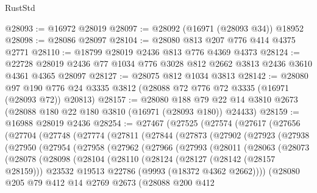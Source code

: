 \begin{lexlean}{RustStd}
\begin{coremodule}
@28093 := @16972 @28019
@28097 := @28092 (@16971 (@28093 @34)) @18952
@28098 := @28086 @28097
@28104 := @28080 @813 @207 @776 @414 @4375 @2771
@28110 := @18799 @28019 @2436 @813 @776 @4369 @4373
@28124 := @22728 @28019 @2436 @77 @1034 @776 @3028 @812 @2662 @3813 @2436 @3610 @4361 @4365 @28097
@28127 := @28075 @812 @1034 @3813
@28142 := @28080
    @97
    @190
    @776
    @24
    @3335
    @3812
    (@28088 @72 @776 @72 @3335 (@16971 (@28093 @72)) @20813)
@28157 := @28080
    @188
    @79
    @22
    @14
    @3810
    @2673
    (@28088 @180 @22 @180 @3810 (@16971 (@28093 @180)) @24433)
@28159 := @16988 @28019 @2436
@28254 := @27467
    (@27525
      (@27574
        (@27617
          (@27656
            (@27704
              (@27748
                (@27774
                  (@27811
                    (@27844
                      (@27873
                        (@27902
                          (@27923
                            (@27938
                              (@27950
                                (@27954
                                  (@27958
                                    (@27962
                                      (@27966
                                        (@27993
                                          (@28011
                                            (@28063
                                              (@28073
                                                (@28078
                                                  (@28098
                                                    (@28104
                                                      (@28110
                                                        (@28124
                                                          (@28127 (@28142 (@28157 @28159)))
                                                          @23532
                                                          @19513
                                                          @22786
                                                          (@9993 (@18372 @4362 @2662))))
                                                      (@28080
                                                        @205
                                                        @79
                                                        @412
                                                        @14
                                                        @2769
                                                        @2673
                                                        (@28088
                                                          @200
                                                          @412

\end{coremodule}
\end{lexlean}
